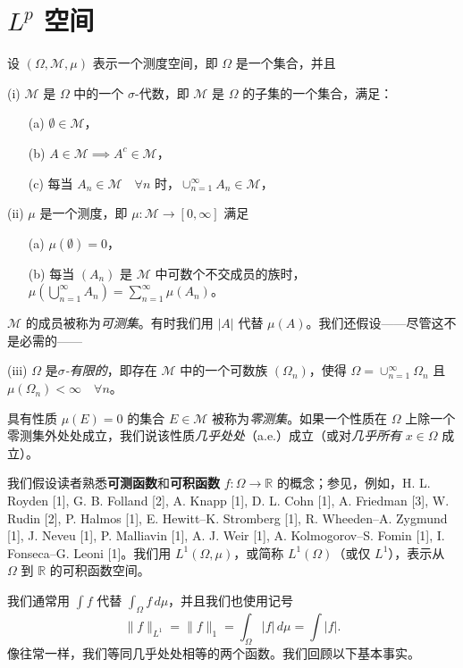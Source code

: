 \chapter{$L^p$ 空间}

设 $(\Omega, \mathcal{M}, \mu)$ 表示一个测度空间，即 $\Omega$ 是一个集合，并且

(i) $\mathcal{M}$ 是 $\Omega$ 中的一个 $\sigma$-代数，即 $\mathcal{M}$ 是 $\Omega$ 的子集的一个集合，满足：
\begin{itemize}
    \item[ (a)] $\emptyset \in \mathcal{M}$，
    \item[ (b)] $A \in \mathcal{M} \implies A^c \in \mathcal{M}$，
    \item[ (c)] 每当 $A_n \in \mathcal{M} \quad \forall n$ 时，$\cup_{n=1}^\infty A_n \in \mathcal{M}$，
\end{itemize}

(ii) $\mu$ 是一个测度，即 $\mu: \mathcal{M} \to [0, \infty]$ 满足
\begin{itemize}
    \item[ (a)] $\mu(\emptyset) = 0$，
    \item[ (b)] 每当 $(A_n)$ 是 $\mathcal{M}$ 中可数个不交成员的族时，$\mu\left(\bigcup_{n=1}^\infty A_n\right) = \sum_{n=1}^\infty \mu(A_n)$。
\end{itemize}
$\mathcal{M}$ 的成员被称为\textit{可测集}。有时我们用 $|A|$ 代替 $\mu(A)$。我们还假设——尽管这不是必需的——

(iii) $\Omega$ 是\textit{$\sigma$-有限的}，即存在 $\mathcal{M}$ 中的一个可数族 $(\Omega_n)$，使得 $\Omega = \cup_{n=1}^\infty \Omega_n$ 且 $\mu(\Omega_n) < \infty \quad \forall n$。

具有性质 $\mu(E)=0$ 的集合 $E \in \mathcal{M}$ 被称为\textit{零测集}。如果一个性质在 $\Omega$ 上除一个零测集外处处成立，我们说该性质\textit{几乎处处}（a.e.）成立（或对\textit{几乎所有} $x \in \Omega$ 成立）。

我们假设读者熟悉\textbf{可测函数}和\textbf{可积函数} $f: \Omega \to \mathbb{R}$ 的概念；参见，例如，H. L. Royden [1], G. B. Folland [2], A. Knapp [1], D. L. Cohn [1], A. Friedman [3], W. Rudin [2], P. Halmos [1], E. Hewitt–K. Stromberg [1], R. Wheeden–A. Zygmund [1], J. Neveu [1], P. Malliavin [1], A. J. Weir [1], A. Kolmogorov–S. Fomin [1], I. Fonseca–G. Leoni [1]。我们用 $L^1(\Omega, \mu)$，或简称 $L^1(\Omega)$（或仅 $L^1$），表示从 $\Omega$ 到 $\mathbb{R}$ 的可积函数空间。

我们通常用 $\int f$ 代替 $\int_\Omega f \,d\mu$，并且我们也使用记号
\[ \|f\|_{L^1} = \|f\|_1 = \int_\Omega |f| \,d\mu = \int |f|. \]
像往常一样，我们等同几乎处处相等的两个函数。我们回顾以下基本事实。

